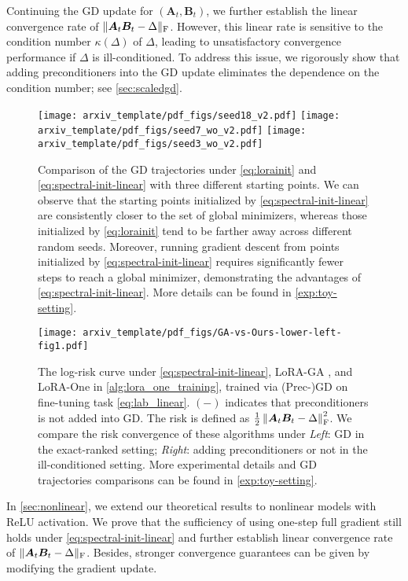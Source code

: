 Continuing the GD update for  $(\bm A_t, \bm B_t)$, we further establish the linear convergence rate of $\| \bm A_t \bm B_t - \Delta \|_{\rm F}$. 
However, this linear rate is sensitive to the condition number $\kappa(\Delta)$ of $\Delta$, leading to unsatisfactory convergence performance if $\Delta$ is ill-conditioned.
To address this issue, we rigorously show that adding preconditioners into the GD update eliminates the dependence on the condition number; see \cref{sec:scaledgd}.
\begin{figure}[t]
    \centering
    \texttt{[image: arxiv\_template/pdf\_figs/seed18\_v2.pdf]}
    \texttt{[image: arxiv\_template/pdf\_figs/seed7\_wo\_v2.pdf]}
    \texttt{[image: arxiv\_template/pdf\_figs/seed3\_wo\_v2.pdf]}
    \caption{Comparison of the GD trajectories under \eqref{eq:lorainit} and \eqref{eq:spectral-init-linear} with three different starting points. We can observe that the starting points initialized by \eqref{eq:spectral-init-linear} are consistently closer to the set of global minimizers, whereas those initialized by \eqref{eq:lorainit} tend to be farther away across different random seeds. Moreover, running gradient descent from points initialized by \eqref{eq:spectral-init-linear} requires significantly fewer steps to reach a global minimizer, demonstrating the advantages of \eqref{eq:spectral-init-linear}. More details can be found in \cref{exp:toy-setting}.}
    \label{fig:phase-transi}
\end{figure}

\begin{figure}[t]
\centering
\texttt{[image: arxiv\_template/pdf\_figs/GA-vs-Ours-lower-left-fig1.pdf]}
\caption{The log-risk curve under \eqref{eq:spectral-init-linear}, LoRA-GA \citep{wang2024lora}, and LoRA-One in \cref{alg:lora_one_training}, trained via (Prec-)GD on fine-tuning task \eqref{eq:lab_linear}. $(-)$ indicates that preconditioners is not added into GD. The risk is defined as $\frac{1}{2}\left\|\bm A_t \bm B_t - \Delta\right\|^2_{\rm F}$. We compare the risk convergence of these algorithms under \textit{Left}: GD in the exact-ranked setting; \textit{Right}: adding preconditioners or not in the ill-conditioned setting. More experimental details and GD trajectories comparisons can be found in \cref{exp:toy-setting}.}
\label{figs:GA-vs-Ours}
\end{figure}

In \cref{sec:nonlinear}, we extend our theoretical results to nonlinear models with ReLU activation. We prove that the sufficiency of using one-step full gradient still holds under \eqref{eq:spectral-init-linear} and further establish linear convergence rate of $\| \bm A_t \bm B_t - \Delta \|_{\rm F}$. Besides, stronger convergence guarantees can be given by modifying the gradient update.

